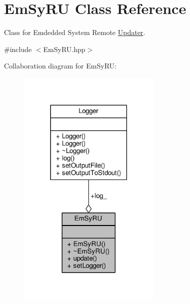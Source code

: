 \hypertarget{classEmSyRU}{\section{Em\-Sy\-R\-U Class Reference}
\label{classEmSyRU}
}


Class for Emdedded System Remote \hyperlink{classUpdater}{Updater}.  




{\ttfamily \#include $<$Em\-Sy\-R\-U.\-hpp$>$}



Collaboration diagram for Em\-Sy\-R\-U\-:\nopagebreak
\begin{figure}[H]
\begin{center}
\leavevmode
\includegraphics[width=194pt]{classEmSyRU__coll__graph}
\end{center}
\end{figure}

